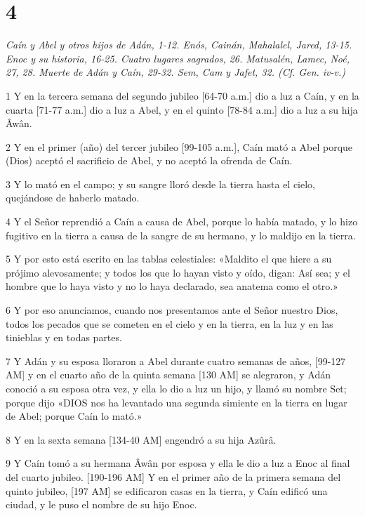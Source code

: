 \chapter{4}

\par \textit{Caín y Abel y otros hijos de Adán, 1-12. Enós, Cainán, Mahalalel, Jared, 13-15. Enoc y su historia, 16-25. Cuatro lugares sagrados, 26. Matusalén, Lamec, Noé, 27, 28. Muerte de Adán y Caín, 29-32. Sem, Cam y Jafet, 32. (Cf. Gen. iv-v.)}

\par 1 Y en la tercera semana del segundo jubileo [64-70 a.m.] dio a luz a Caín, y en la cuarta [71-77 a.m.] dio a luz a Abel, y en el quinto [78-84 a.m.] dio a luz a su hija Âwân.
\par 2 Y en el primer (año) del tercer jubileo [99-105 a.m.], Caín mató a Abel porque (Dios) aceptó el sacrificio de Abel, y no aceptó la ofrenda de Caín.
\par 3 Y lo mató en el campo; y su sangre lloró desde la tierra hasta el cielo, quejándose de haberlo matado.
\par 4 Y el Señor reprendió a Caín a causa de Abel, porque lo había matado, y lo hizo fugitivo en la tierra a causa de la sangre de su hermano, y lo maldijo en la tierra.
\par 5 Y por esto está escrito en las tablas celestiales: «Maldito el que hiere a su prójimo alevosamente; y todos los que lo hayan visto y oído, digan: Así sea; y el hombre que lo haya visto y no lo haya declarado, sea anatema como el otro.»
\par 6 Y por eso anunciamos, cuando nos presentamos ante el Señor nuestro Dios, todos los pecados que se cometen en el cielo y en la tierra, en la luz y en las tinieblas y en todas partes.
\par 7 Y Adán y su esposa lloraron a Abel durante cuatro semanas de años, [99-127 AM] y en el cuarto año de la quinta semana [130 AM] se alegraron, y Adán conoció a su esposa otra vez, y ella lo dio a luz un hijo, y llamó su nombre Set; porque dijo «DIOS nos ha levantado una segunda simiente en la tierra en lugar de Abel; porque Caín lo mató.»
\par 8 Y en la sexta semana [134-40 AM] engendró a su hija Azûrâ.
\par 9 Y Caín tomó a su hermana Âwân por esposa y ella le dio a luz a Enoc al final del cuarto jubileo. [190-196 AM] Y en el primer año de la primera semana del quinto jubileo, [197 AM] se edificaron casas en la tierra, y Caín edificó una ciudad, y le puso el nombre de su hijo Enoc.
